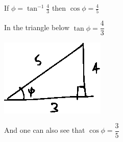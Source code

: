 \documentclass[14pt,fleqn]{extarticle}
\newcommand\angb{\tan^{-1}\frac{4}{3}}
\begin{document}
 
\begin{snippet}
    
    \incorrect
    
    If $\phi = \angb$ then $\cos\phi=\frac{4}{5}$ 
    
    \reason
    
    In the triangle below $\tan\phi = \dfrac{4}{3}$ 
    
    \begin{center}
\includegraphics[scale=1.4]{74-A.eps}
\end{center}
    And one can also see that $\cos\phi = \dfrac{3}{5}$ 
    
\end{snippet} 
\end{document}
